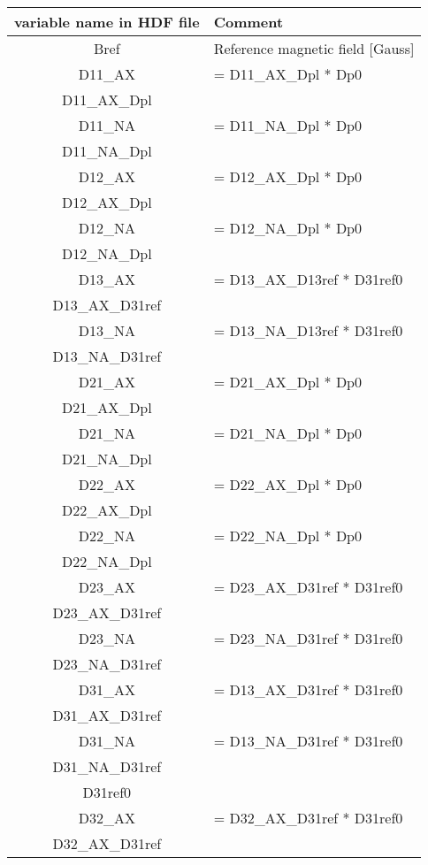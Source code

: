\begin{table}[h]
\begin{tabular}{|c|l|}
\hline
variable name in HDF file  & Comment
\\
\hline
Bref & Reference magnetic field [Gauss] \\
\hline
D11\_AX & = D11\_AX\_Dpl * Dp0 \\
\hline
D11\_AX\_Dpl & \\
\hline
D11\_NA & = D11\_NA\_Dpl * Dp0 \\
\hline
D11\_NA\_Dpl & \\
\hline
D12\_AX & = D12\_AX\_Dpl * Dp0 \\
\hline
D12\_AX\_Dpl & \\
\hline
D12\_NA & = D12\_NA\_Dpl * Dp0 \\
\hline
D12\_NA\_Dpl & \\
\hline
D13\_AX & = D13\_AX\_D13ref * D31ref0 \\
\hline
D13\_AX\_D31ref & \\
\hline
D13\_NA & = D13\_NA\_D13ref * D31ref0 \\
\hline
D13\_NA\_D31ref & \\
\hline
D21\_AX & = D21\_AX\_Dpl * Dp0 \\
\hline
D21\_AX\_Dpl & \\
\hline
D21\_NA & = D21\_NA\_Dpl * Dp0 \\
\hline
D21\_NA\_Dpl & \\
\hline
D22\_AX & = D22\_AX\_Dpl * Dp0 \\
\hline
D22\_AX\_Dpl & \\
\hline
D22\_NA & = D22\_NA\_Dpl * Dp0 \\
\hline
D22\_NA\_Dpl & \\
\hline
D23\_AX & = D23\_AX\_D31ref * D31ref0 \\
\hline
D23\_AX\_D31ref & \\
\hline
D23\_NA & = D23\_NA\_D31ref * D31ref0 \\
\hline
D23\_NA\_D31ref & \\
\hline
D31\_AX & = D13\_AX\_D31ref * D31ref0 \\
\hline
D31\_AX\_D31ref & \\
\hline
D31\_NA & = D13\_NA\_D31ref * D31ref0 \\
\hline
D31\_NA\_D31ref & \\
\hline
D31ref0 & \\
\hline
D32\_AX & = D32\_AX\_D31ref * D31ref0 \\
\hline
D32\_AX\_D31ref & \\

\end{tabular}
\end{table}
